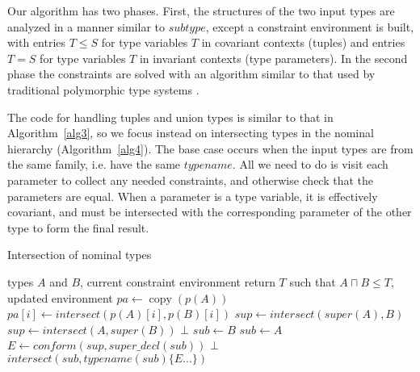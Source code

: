 \documentclass[9pt]{sigplanconf}
\begin{document}
Our algorithm has two phases. First, the structures of the two input types
are analyzed in a manner similar to $subtype$, except a constraint
environment is built, with entries $T\leq S$ for type variables $T$ in
covariant contexts (tuples) and entries $T=S$ for type variables $T$ in
invariant contexts (type parameters). In the second phase the constraints
are solved with an algorithm similar to that
used by traditional polymorphic type systems \cite{MLtypeinf}.

The code for handling tuples and union types is similar to that in
Algorithm~\ref{alg3}, so we focus instead on intersecting types in the
nominal hierarchy (Algorithm~\ref{alg4}). The base case occurs when
the input types are from the same family, i.e. have the same
$typename$. All we need to do is visit each parameter to collect any
needed constraints, and otherwise check that the parameters are equal.
When a parameter is a type variable, it is effectively covariant, and
must be intersected with the corresponding parameter of the other type
to form the final result.

\begin{algorithm}
\caption{Intersection of nominal types}
\label{alg4}
\begin{algorithmic}
\REQUIRE types $A$ and $B$, current constraint environment
\ENSURE return $T$ such that $A \sqcap B \leq T$, updated environment
 \STATE $pa \leftarrow \operatorname{copy}(p(A))$
  \ENDIF
  \STATE $pa[i] \leftarrow intersect(p(A)[i],p(B)[i])$
 \ENDFOR
\ELSE
 \STATE $sup \leftarrow intersect(super(A),B)$
  \STATE $sup \leftarrow intersect(A,super(B))$
   \RETURN $\bot$
  \ELSE
   \STATE $sub \leftarrow B$
  \ENDIF
 \ELSE
  \STATE $sub \leftarrow A$
 \ENDIF
 \STATE $E \leftarrow conform(sup, super\_decl(sub))$
  \RETURN $\bot$
 \ENDIF
 \RETURN $intersect(sub, typename(sub)\{E...\})$
\ENDIF
\end{algorithmic}
\end{algorithm}
\end{document}
